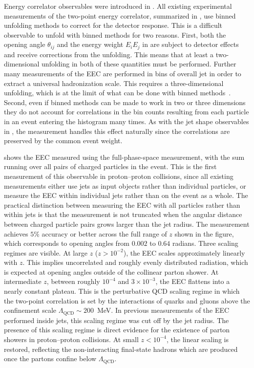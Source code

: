 Energy correlator observables were introduced in .
All existing experimental measurements of the two-point energy correlator, summarized in , use binned unfolding methods to correct for the detector response.
This is a difficult observable to unfold with binned methods for two reasons.
First, both the opening angle $\theta_{ij}$ and the energy weight $E_i E_j$ in  are subject to detector effects and receive corrections from the unfolding.
This means that at least a two-dimensional unfolding in both of these quantities must be performed.
Further many measurements of the EEC are performed in bins of overall jet \pt in order to extract a universal hadronization scale.
This requires a three-dimensional unfolding, which is at the limit of what can be done with binned methods~\cite{CMS:2024mlf}.
Second, even if binned methods can be made to work in two or three dimensions they do not account for correlations in the bin counts resulting from each particle in an event entering the histogram many times.
As with the jet shape observables in , the \Omnifold measurement handles this effect naturally since the correlations are preserved by the common event weight.

 shows the EEC measured using the full-phase-space measurement, with the sum running over all pairs of charged particles in the event.
This is the first measurement of this observable in proton--proton collisions, since all existing measurements either use jets as input objects rather than individual particles, or measure the EEC within individual jets rather than on the event as a whole.
The practical distinction between measuring the EEC with all particles rather than within jets is that the measurement is not truncated when the angular distance between charged particle pairs grows larger than the jet radius.
The measurement achieves $5\%$ accuracy or better across the full range of $z$ shown in the figure, which corresponds to opening angles from $0.002$ to $0.64$ radians.
Three scaling regimes are visible.
At large $z$ ($z > 10^{-2}$), the EEC scales approximately linearly with $z$.
This implies uncorrelated and roughly evenly distributed radiation, which is expected at opening angles outside of the collinear parton shower.
At intermediate $z$, between roughly $10^{-4}$ and $3 \times 10^{-3}$, the EEC flattens into a nearly constant plateau.
This is the perturbative QCD scaling regime in which the two-point correlation is set by the interactions of quarks and gluons above the confinement scale $\Lambda_{\mathrm{QCD}} \sim 200$~MeV.
In previous measurements of the EEC performed inside jets, this scaling regime was cut off by the jet radius.
The presence of this scaling regime is direct evidence for the existence of parton showers in proton--proton collisions.
At small $z < 10^{-4}$, the linear scaling is restored, reflecting the non-interacting final-state hadrons which are produced once the partons confine below $\Lambda_{\mathrm{QCD}}$.

